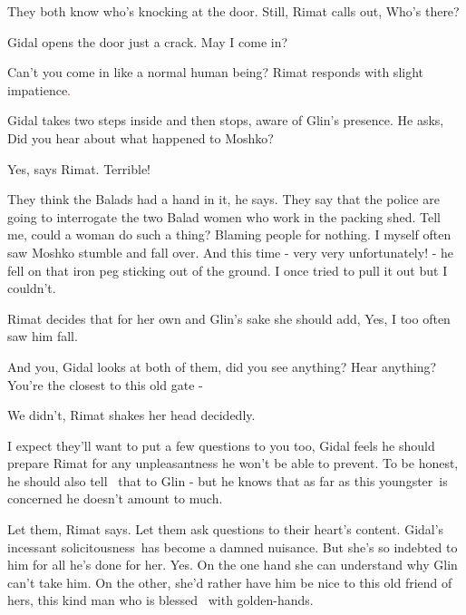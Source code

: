 \documentclass[letterpaper]{article}
\begin{document}
They both know who's knocking at the door. Still, Rimat calls out, {\textquotedbl}Who's there?{\textquotedbl}

Gidal opens the door just a crack. {\textquotedbl}May I come in?{\textquotedbl} 

{\textquotedbl}Can't you come in like a normal human being?{\textquotedbl} Rimat responds with slight
impatience\textcolor{red}{. \ }

Gidal takes two steps inside and then stops, aware of Glin's presence. He asks, {\textquotedbl}Did you hear about what
happened to Moshko?{\textquotedbl}

{\textquotedbl}Yes,{\textquotedbl} says Rimat. {\textquotedbl}Terrible!{\textquotedbl} 

{\textquotedbl}They think the Balads had a hand in it,{\textquotedbl} he says. {\textquotedbl}They say that the police
are going to interrogate the two Balad women who work in the packing shed. Tell me, could a woman do such a thing?
Blaming people for nothing. I myself often saw Moshko stumble and fall over. And this time - very very unfortunately! -
he fell on that iron peg sticking out of the ground. I once tried to pull it out but I couldn't.{\textquotedbl} 

Rimat decides that for her own and Glin's sake she should add, {\textquotedbl}Yes, I too often saw him
fall.{\textquotedbl} 

{\textquotedbl}And you,{\textquotedbl} Gidal looks at both of them, {\textquotedbl}did you see anything? Hear anything?
You're the closest to this old gate -{\textquotedbl} 

{\textquotedbl}We didn't,{\textquotedbl} Rimat shakes her head decidedly. 

{\textquotedbl}I expect they'll want to put a few questions to you too,{\textquotedbl} Gidal feels he should prepare
Rimat for any unpleasantness he won't be able to prevent. To be honest, he should also tell \ that to Glin - but he
knows that as far as this youngster~is concerned he doesn't amount to much. 

{\textquotedbl}Let them,{\textquotedbl} Rimat says. {\textquotedbl}Let them ask questions to their heart's
content.{\textquotedbl} Gidal's incessant solicitousness~has become a damned nuisance. But she's so indebted to him for
all he's done for her. Yes. On the one hand she can understand why Glin can't take him. On the other, she'd rather have
him be nice to this old friend of hers, this kind man who is blessed \ with golden-hands.
\end{document}
